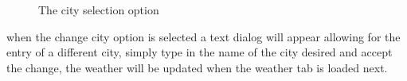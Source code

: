 \begin{figure}[H]
  \caption{The city selection option}%
  \label{fig:setcity}%
\end{figure}

when the change city option is selected a text dialog will appear
allowing for the entry of a different city, simply type in the name of
the city desired and accept the change, the weather will be updated when
the weather tab is loaded next.
